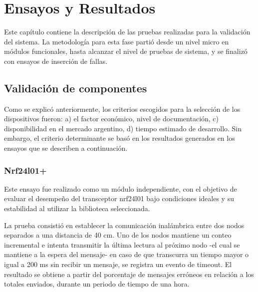 
\chapter{Ensayos y Resultados} %

\label{Chapter4} %


Este capítulo contiene la  descripción de  las pruebas realizadas para la validación del sistema. La metodología para esta fase partió desde un nivel micro en módulos funcionales,  hasta alcanzar el nivel de pruebas de sistema,  y se finalizó con ensayos de inserción de fallas.


\section{Validación de componentes}
\label{sec:validacion_componentes}

Como se explicó anteriormente, los criterios escogidos para la selección de los dispositivos fueron: a) el factor económico, nivel de documentación,  c) disponibilidad en el mercado argentino, d) tiempo estimado de desarrollo. Sin embargo, el criterio determinante se basó en los resultados generados en los ensayos que se describen a continuación.

\subsection{Nrf24l01+}

Este ensayo fue realizado como un módulo independiente, con el objetivo de evaluar el desempeño del transceptor nrf24l01 bajo condiciones ideales y su estabilidad al utilizar la biblioteca seleccionada.

La prueba consistió  en establecer la comunicación inalámbrica entre dos nodos separados a una distancia de 40 cm. Uno de los nodos mantiene un conteo incremental e intenta transmitir la última lectura al próximo nodo -el cual se mantiene a la espera del mensaje- en caso de que transcurra un tiempo mayor o igual a 200 ms sin recibir un mensaje, se registra un evento de timeout. El resultado se obtiene a partir del porcentaje de mensajes erróneos en relación a los totales enviados, durante un periodo de tiempo de una hora.

